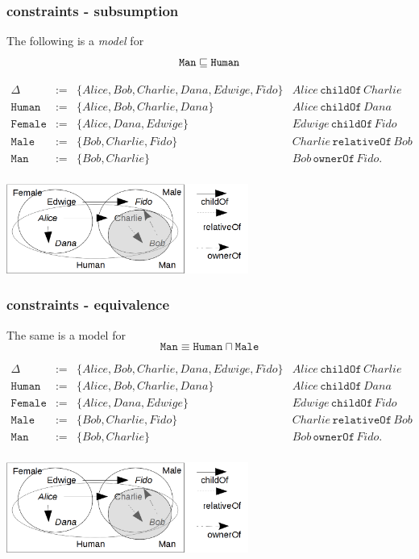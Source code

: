\documentclass[8pt]{beamer}
\newcommand{\Human}{\mathtt{Human}}
\newcommand{\Male}{\mathtt{Male}}
\newcommand{\Female}{\mathtt{Female}}
\newcommand{\Man}{\mathtt{Man}}
\newcommand{\relative}{\mathtt{relativeOf}}
\newcommand{\child}{\mathtt{childOf}}
\newcommand{\owner}{\mathtt{ownerOf}}
\newcommand{\Alice}{Alice}
\newcommand{\Bob}{Bob}
\newcommand{\Charlie}{Charlie}
\newcommand{\Dana}{Dana}
\newcommand{\Edwige}{Edwige}
\newcommand{\Fido}{Fido}
\begin{document}
\begin{frame}
 \frametitle{\elplusplus constraints - subsumption}
 The following is a \emph{model} for
 \[
    \Man \Issub \Human
 \]
 
 \[
 \begin{array}{rcl|l}
  \Delta & := & \{ \Alice, \Bob, \Charlie, \Dana, \Edwige, \Fido \} & \Alice\,\child\,\Charlie \\
  \Human & := & \{ \Alice, \Bob, \Charlie, \Dana \} & \Alice\,\child\,\Dana\\
  \Female & := & \{ \Alice, \Dana, \Edwige \} & \Edwige\,\child\,\Fido\\
  \Male & := & \{ \Bob, \Charlie, \Fido \} & \Charlie\,\relative\,\Bob \\
  \Man & := & \{ \Bob, \Charlie \} & \Bob\,\owner\,\Fido . \\
 \end{array}
\]

 \begin{center}
  \includegraphics[width=300px, keepaspectratio]{images/exsub_big.png}  
 \end{center}
\end{frame}

\begin{frame}
 \frametitle{\elplusplus constraints - equivalence}
 The same is a model for
 \[
    \Man \equiv \Human \sqcap \Male
 \]
 
 \[
 \begin{array}{rcl|l}
  \Delta & := & \{ \Alice, \Bob, \Charlie, \Dana, \Edwige, \Fido \} & \Alice\,\child\,\Charlie \\
  \Human & := & \{ \Alice, \Bob, \Charlie, \Dana \} & \Alice\,\child\,\Dana\\
  \Female & := & \{ \Alice, \Dana, \Edwige \} & \Edwige\,\child\,\Fido\\
  \Male & := & \{ \Bob, \Charlie, \Fido \} & \Charlie\,\relative\,\Bob \\
  \Man & := & \{ \Bob, \Charlie \} & \Bob\,\owner\,\Fido . \\
 \end{array}
\]

 \begin{center}
  \includegraphics[width=300px, keepaspectratio]{images/exsub_big.png}  
 \end{center}
\end{frame}
\end{document}
